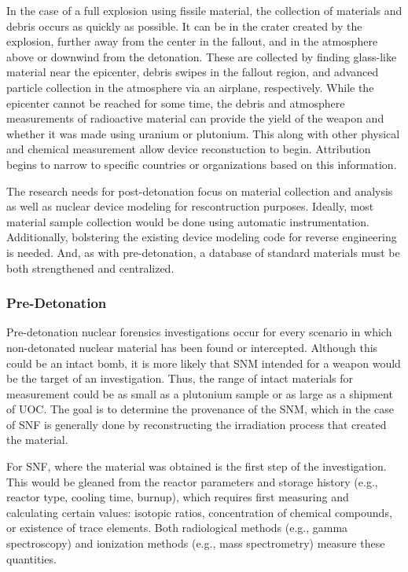 In the case of a full explosion using fissile material, the collection of
materials and debris occurs as quickly as possible.  It can be in the crater
created by the explosion, further away from the center in the fallout, and in
the atmosphere above or downwind from the detonation. These are collected by
finding glass-like material near the epicenter, debris swipes in the fallout
region, and advanced particle collection in the atmosphere via an airplane,
respectively.  While the epicenter cannot be reached for some time, the debris
and atmosphere measurements of radioactive material can provide the yield of
the weapon and whether it was made using uranium or plutonium. This along with
other physical and chemical measurement allow device reconstuction to begin.
Attribution begins to narrow to specific countries or organizations based on
this information. \cite{aps_aaas_forensics}

The research needs for post-detonation focus on material collection and
analysis as well as nuclear device modeling for rescontruction purposes.
Ideally, most material sample collection would be done using automatic
instrumentation.  Additionally, bolstering the existing device modeling code
for reverse engineering is needed.  And, as with pre-detonation, a database of
standard materials must be both strengthened and centralized.
\cite{aps_aaas_forensics}

\subsubsection{Pre-Detonation}
\label{sec:predet}

Pre-detonation nuclear forensics investigations occur for every scenario in
which non-detonated nuclear material has been found or intercepted. Although
this could be an intact bomb, it is more likely that \gls{SNM} intended for a
weapon would be the target of an investigation. Thus, the range of intact
materials for measurement could be as small as a plutonium sample or as large
as a shipment of \gls{UOC}.  The goal is to determine the provenance of the
\gls{SNM}, which in the case of \gls{SNF} is generally done by reconstructing
the irradiation process that created the material. 

For \gls{SNF}, where the material was obtained is the first step of the
investigation. This would be gleaned from the reactor parameters and storage
history (e.g., reactor type, cooling time, burnup), which requires first
measuring and calculating certain values: isotopic ratios, concentration of
chemical compounds, or existence of trace elements.  Both radiological methods
(e.g., gamma spectroscopy) and ionization methods (e.g., mass spectrometry)
measure these quantities.  

